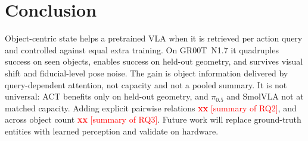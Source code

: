 \documentclass[letterpaper, 10pt, journal, twoside]{IEEEtran}
\newcommand{\tbd}[1][]{\textcolor{red}{\textbf{xx}#1}}
\begin{document}
\section{Conclusion}
\label{sec:conclusion}
Object-centric state helps a pretrained VLA when it is retrieved per action
query and controlled against equal extra training. On GR00T~N1.7 it
quadruples success on seen objects, enables success on held-out geometry,
and survives visual shift and fiducial-level pose noise. The gain is object
information delivered by query-dependent attention, not capacity and not a
pooled summary. It is not universal: ACT benefits only on held-out geometry,
and $\pi_{0.5}$ and SmolVLA not at matched capacity. Adding explicit
pairwise relations \tbd[ {[}summary of RQ2{]}], and across object count
\tbd[ {[}summary of RQ3{]}]. Future work will replace ground-truth entities
with learned perception and validate on hardware.
\end{document}
